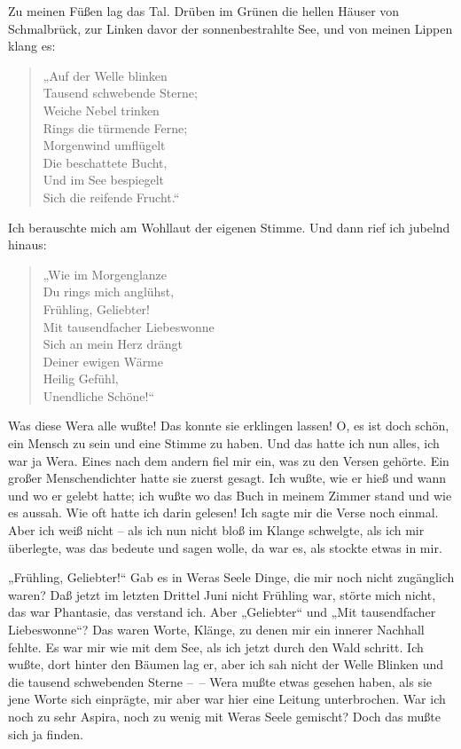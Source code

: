 Zu meinen Füßen lag das Tal. Drüben im Grünen die hellen Häuser von
Schmalbrück, zur Linken davor der sonnenbestrahlte See, und von
meinen Lippen klang es:

\begin{verse}
„Auf der Welle blinken\\ Tausend schwebende Sterne;\\ Weiche Nebel
trinken\\ Rings die türmende Ferne;\\ Morgenwind umflügelt\\ Die
beschattete Bucht,\\ Und im See bespiegelt\\ Sich die reifende
Frucht.“
\end{verse}
Ich berauschte mich am Wohllaut der eigenen Stimme. Und dann rief
ich jubelnd hinaus:

\begin{verse}

„Wie im Morgenglanze\\ Du rings mich anglühst,\\ Frühling,
Geliebter!\\ Mit tausendfacher Liebeswonne\\ Sich an mein Herz
drängt\\ Deiner ewigen Wärme\\ Heilig Gefühl,\\ Unendliche Schöne!“
\end{verse}
Was diese Wera alle wußte! Das konnte sie erklingen lassen! O, es
ist doch schön, ein Mensch zu sein und eine Stimme zu haben. Und
das hatte ich nun alles, ich war ja Wera. Eines nach dem andern
fiel mir ein, was zu den Versen gehörte. Ein großer Menschendichter
hatte sie zuerst gesagt. Ich wußte, wie er hieß und wann und wo er
gelebt hatte; ich wußte wo das Buch in meinem Zimmer stand und wie
es aussah. Wie oft hatte ich darin gelesen! Ich sagte mir die Verse
noch einmal. Aber ich weiß nicht – als ich nun nicht bloß im Klange
schwelgte, als ich mir überlegte, was das bedeute und sagen wolle,
da war es, als stockte etwas in mir.

„Frühling, Geliebter!“ Gab es in Weras Seele Dinge, die mir noch
nicht zugänglich waren? Daß jetzt im letzten Drittel Juni nicht
Frühling war, störte mich nicht, das war Phantasie, das verstand
ich. Aber „Geliebter“ und „Mit tausendfacher Liebeswonne“? Das
waren Worte, Klänge, zu denen mir ein innerer Nachhall fehlte. Es
war mir wie mit dem See, als ich jetzt durch den Wald schritt. Ich
wußte, dort hinter den Bäumen lag er, aber ich sah nicht der Welle
Blinken und die tausend schwebenden Sterne –~– Wera mußte etwas
gesehen haben, als sie jene Worte sich einprägte, mir aber war hier
eine Leitung unterbrochen. War ich noch zu sehr Aspira, noch zu
wenig mit Weras Seele gemischt? Doch das mußte sich ja finden.

